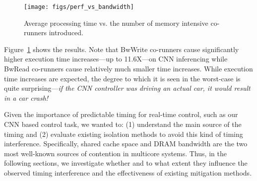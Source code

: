 \begin{figure}[h]
  \centering
  \texttt{[image: figs/perf\_vs\_bandwidth]}
  \caption{Average processing time vs. the number of memory
    intensive co-runners introduced.}
  \label{fig:perf_vs_bandwidth}
\end{figure}


Figure~\ref{fig:perf_vs_bandwidth} shows the results. Note
that BwWrite co-runners cause significantly higher execution time
increases---up to 11.6X---on CNN inferencing while BwRead co-runners
cause relatively much smaller time increases. While execution time
increases are expected, the degree to which it is seen in the worst-case
is quite surprising---\emph{if the CNN controller was driving an actual
car, it would result in a car crash!}

Given the importance of predictable timing for real-time control, such
as our CNN based control task, we wanted to: (1) understand the main
source of the timing and (2) evaluate existing isolation methods to
avoid this kind of timing interference. Specifically, shared cache
space and DRAM bandwidth are the two most well-known sources of contention
in multicore systems. Thus, in the following sections, we investigate whether
and to what extent they influence the observed timing interference and
the effectiveness of existing mitigation methods.




